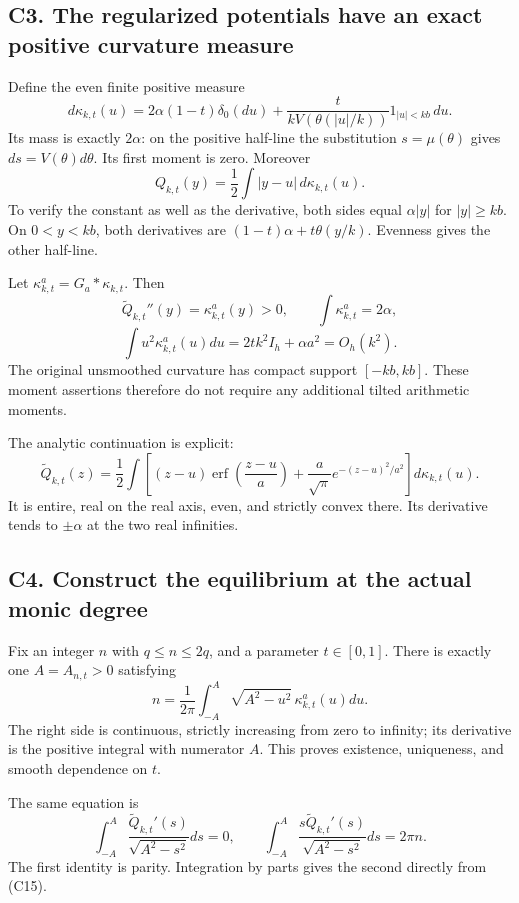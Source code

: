 \documentclass[11pt,a4paper]{article}
\begin{document}
\subsection{C3. The regularized potentials have an exact positive
curvature
measure}\label{sa:c3.-the-regularized-potentials-have-an-exact-positive-curvature-measure}

Define the even finite positive measure \[
d\kappa_{k,t}(u)=2\alpha(1-t)\delta_0(du)
+\frac{t}{kV(\theta(|u|/k))}1_{|u|<kb}\,du.
\tag{C11}
\] Its mass is exactly \(2\alpha\): on the positive half-line the
substitution \(s=\mu(\theta)\) gives \(ds=V(\theta)d\theta\). Its first
moment is zero. Moreover \[
\boxed{Q_{k,t}(y)=\frac12\int|y-u|\,d\kappa_{k,t}(u).}\tag{C12}
\] To verify the constant as well as the derivative, both sides equal
\(\alpha|y|\) for \(|y|\ge kb\). On \(0<y<kb\), both derivatives are
\((1-t)\alpha+t\theta(y/k)\). Evenness gives the other half-line.

Let \(\kappa^a_{k,t}=G_a*\kappa_{k,t}\). Then \[
\widetilde Q_{k,t}''(y)=\kappa^a_{k,t}(y)>0,
\qquad \int\kappa^a_{k,t}=2\alpha,
\] \[
\int u^2\kappa^a_{k,t}(u)du=2tk^2I_h+\alpha a^2=O_h(k^2).
\tag{C13}
\] The original unsmoothed curvature has compact support \([-kb,kb]\).
These moment assertions therefore do not require any additional tilted
arithmetic moments.

The analytic continuation is explicit: \[
\widetilde Q_{k,t}(z)=\frac12\int
\left[(z-u)\operatorname{erf}\!\left(\frac{z-u}{a}\right)
+\frac a{\sqrt\pi}e^{-(z-u)^2/a^2}\right]d\kappa_{k,t}(u).
\tag{C14}
\] It is entire, real on the real axis, even, and strictly convex there.
Its derivative tends to \(\pm\alpha\) at the two real infinities.

\subsection{C4. Construct the equilibrium at the actual monic
degree}\label{sa:c4.-construct-the-equilibrium-at-the-actual-monic-degree}

Fix an integer \(n\) with \(q\le n\le2q\), and a parameter
\(t\in[0,1]\). There is exactly one \(A=A_{n,t}>0\) satisfying \[
\boxed{n=\frac1{2\pi}\int_{-A}^{A}
\sqrt{A^2-u^2}\,\kappa^a_{k,t}(u)du.}\tag{C15}
\] The right side is continuous, strictly increasing from zero to
infinity; its derivative is the positive integral with numerator \(A\).
This proves existence, uniqueness, and smooth dependence on \(t\).

The same equation is \[
\int_{-A}^A\frac{\widetilde Q_{k,t}'(s)}{\sqrt{A^2-s^2}}ds=0,
\qquad
\int_{-A}^A\frac{s\widetilde Q_{k,t}'(s)}{\sqrt{A^2-s^2}}ds=2\pi n.
\tag{C16}
\] The first identity is parity. Integration by parts gives the second
directly from (C15).
\end{document}
